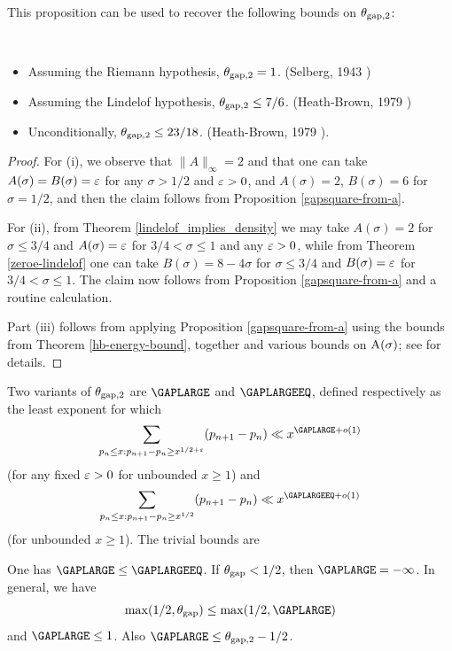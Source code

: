 

This proposition can be used to recover the following bounds on $\theta_{\mathrm{gap},2}$:

\begin{corollary}\
    \begin{itemize}
    \item[(i)] Assuming the Riemann hypothesis, $\theta_{\mathrm{gap},2} = 1$. (Selberg, 1943 \cite{selberg_1943})
    \item[(ii)] Assuming the Lindelof hypothesis, $\theta_{\mathrm{gap},2} \leq 7/6$. (Heath-Brown, 1979 \cite{heath_brown_consecutive_II})
    \item[(iii)] Unconditionally, $\theta_{\mathrm{gap},2} \leq 23/18$. (Heath-Brown, 1979 \cite{heath_brown_consecutive_III}).
\end{itemize}
\end{corollary}

\begin{proof} For (i), we observe that $\|A\|_\infty=2$ and that one can take $A(\sigma)=B(\sigma)=\varepsilon$ for any $\sigma>1/2$ and $\varepsilon>0$, and $A(\sigma)=2$, $B(\sigma)=6$ for $\sigma=1/2$, and then the claim follows from Proposition \ref{gapsquare-from-a}.

For (ii), from Theorem \ref{lindelof_implies_density} we may take $A(\sigma)=2$ for $\sigma \leq 3/4$ and $A(\sigma)=\varepsilon$ for $3/4 < \sigma \leq 1$ and any $\varepsilon>0$, while from Theorem \ref{zeroe-lindelof} one can take $B(\sigma) = 8-4\sigma$ for $\sigma \leq 3/4$ and $B(\sigma)=\varepsilon$ for $3/4 < \sigma \leq 1$.  The claim now follows from Proposition \ref{gapsquare-from-a} and a routine calculation.

Part (iii) follows from applying Proposition \ref{gapsquare-from-a} using the bounds from Theorem \ref{hb-energy-bound}, together and various bounds on $\mathrm{A}(\sigma)$; see \cite[Theorem 12.14]{ivic} for details.
\end{proof}

Two variants of $\theta_{\mathrm{gap},2}$ are $\GAPLARGE$ and $\GAPLARGEEQ$, defined respectively as the least exponent for which
$$ \sum_{p_n \leq x: p_{n+1}-p_n \geq x^{1/2+\eps}} (p_{n+1}-p_n) \ll x^{\GAPLARGE+o(1)}$$
(for any fixed $\varepsilon>0$ for unbounded $x \geq 1$) and
$$ \sum_{p_n \leq x: p_{n+1}-p_n \geq x^{1/2}} (p_{n+1}-p_n) \ll x^{\GAPLARGEEQ+o(1)}$$
(for unbounded $x \geq 1$).  The trivial bounds are

\begin{proposition}\label{trivial-large-gap}  One has $\GAPLARGE \le \GAPLARGEEQ$. If $\theta_{\mathrm{gap}} < 1/2$, then $\GAPLARGE = -\infty$.  In general, we have
    $$ \max(1/2,\GAPMAX) \leq \max(1/2, \GAPLARGE)$$
    and $\GAPLARGE \leq 1$.  Also $\GAPLARGE \leq \GAPSQUARE - 1/2$.
\end{proposition}

